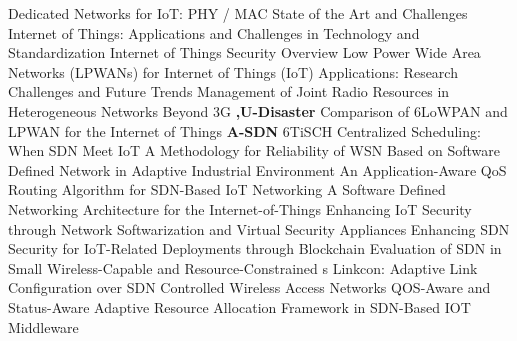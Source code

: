  \cite{goursaud_dedicated_2015} Dedicated Networks for {{IoT}}: {{PHY}} / {{MAC}} State of the Art and Challenges \newline 
 \cite{bandyopadhyay_internet_2011} Internet of {{Things}}: {{Applications}} and {{Challenges}} in {{Technology}} and {{Standardization}} \newline 
 \cite{marchand_internet_nodate} Internet of {{Things}} Security Overview \newline 
 \cite{boulogeorgos_low_2016} Low {{Power Wide Area Networks}} ({{LPWANs}}) for {{Internet}} of {{Things}} ({{IoT}}) {{Applications}}: {{Research Challenges}} and {{Future Trends}} \newline 
 \cite{kaddour_management_2017} Management of Joint Radio Resources in Heterogeneous Networks {{Beyond 3G}} \newline 
\textbf{,U-Disaster} \newline  \cite{al-kashoash_comparison_2016} Comparison of {{6LoWPAN}} and {{LPWAN}} for the {{Internet}} of {{Things}} \newline 
\textbf{A-SDN} \newline  \cite{thubert_6tisch_2015} {{6TiSCH}} Centralized Scheduling: {{When SDN}} Meet {{IoT}} \newline 
 \cite{duan_methodology_2018} A Methodology for Reliability of {{WSN}} Based on Software Defined Network in Adaptive Industrial Environment \newline 
 \cite{deng_applicationaware_2018} An {{Application}}-Aware {{QoS Routing Algorithm}} for {{SDN}}-Based {{IoT Networking}} \newline 
 \cite{qin_software_2014} A {{Software Defined Networking}} Architecture for the {{Internet}}-of-{{Things}} \newline 
 \cite{zarca_enhancing_2018} Enhancing {{IoT}} Security through Network Softwarization and Virtual Security Appliances \newline 
 \cite{tselios_enhancing_2017} Enhancing {{SDN}} Security for {{IoT}}-Related Deployments through Blockchain \newline 
 \cite{beyene_evaluation_2017} Evaluation of {{SDN}} in {{Small Wireless}}-Capable and {{Resource}}-Constrained {{s}} \newline 
 \cite{karmakar_linkcon_2017} Linkcon: {{Adaptive Link Configuration}} over {{SDN Controlled Wireless Access Networks}} \newline 
 \cite{meshinchi_qosaware_2018} {{QOS}}-{{Aware}} and {{Status}}-{{Aware Adaptive Resource Allocation Framework}} in {{SDN}}-{{Based IOT Middleware}} \newline 
